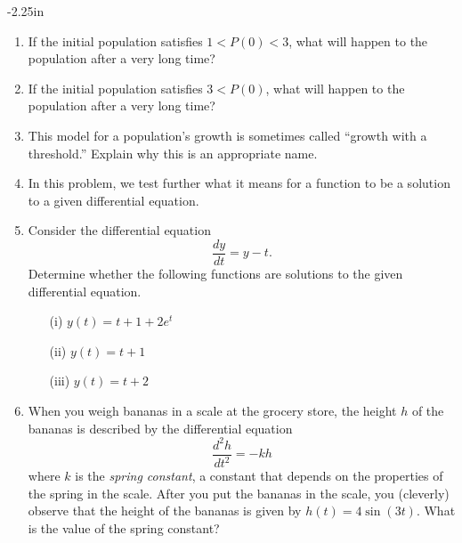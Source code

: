 \begin{adjustwidth*}{}{-2.25in}
\begin{multicols*}{2}
\begin{enumerate}[1)]
      \item  If the initial population satisfies $1<P(0)<3$, what will
      happen to the population after a very long time?

      \item If the initial population satisfies $3<P(0)$, what will
      happen to the population after a very long time?

      \item  This model for a population's growth is sometimes called
      ``growth with a threshold.''  Explain why this is an appropriate
      name.  

\ea

  \item In this problem, we test further what it means for a function to be a solution to a given differential equation.
  \ba
  	\item Consider the differential equation
      $$
      \frac{dy}{dt} = y - t.
      $$
      Determine whether the following functions are solutions to the given differential equation.

      \begin{itemize}
 	\item[(i)] $y(t) = t + 1 + 2e^t$
	\item[(ii)] $y(t) = t + 1$
	\item[(iii)] $y(t) = t + 2$
       \end{itemize}

	\item   When you weigh bananas in a scale at the grocery store, the
      height $h$ of the bananas is described by the differential
      equation
      $$
      \frac{d^2h}{dt^2} = -kh
      $$
      where $k$ is the {\em spring constant}, a constant that depends
      on the properties of the spring in the scale.  After you put the
      bananas in the scale, you (cleverly) observe that the height of the bananas
      is given by $h(t) = 4\sin(3t)$.  What is the value of the spring
      constant? 
    \ea
        
\end{enumerate}

\end{multicols*}
\end{adjustwidth*}

\afterexercises